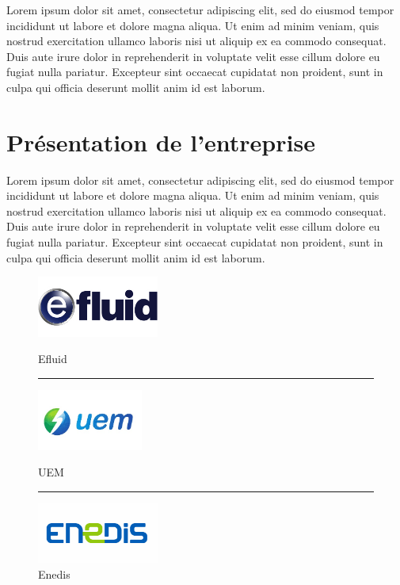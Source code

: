 \documentclass[a4paper, 12pt]{report}
\begin{document}
Lorem ipsum dolor sit amet, consectetur adipiscing elit, sed do eiusmod tempor incididunt ut labore et dolore magna aliqua. Ut enim ad minim veniam, quis nostrud exercitation ullamco laboris nisi ut aliquip ex ea commodo consequat. Duis aute irure dolor in reprehenderit in voluptate velit esse cillum dolore eu fugiat nulla pariatur. Excepteur sint occaecat cupidatat non proident, sunt in culpa qui officia deserunt mollit anim id est laborum.

\chapter{Présentation de l'entreprise}

Lorem ipsum dolor sit amet, consectetur adipiscing elit, sed do eiusmod tempor incididunt ut labore et dolore magna aliqua. Ut enim ad minim veniam, quis nostrud exercitation ullamco laboris nisi ut aliquip ex ea commodo consequat. Duis aute irure dolor in reprehenderit in voluptate velit esse cillum dolore eu fugiat nulla pariatur. Excepteur sint occaecat cupidatat non proident, sunt in culpa qui officia deserunt mollit anim id est laborum.

\begin{figure}
  \begin{center}
    \begin{minipage}{4cm}
      \begin{center}
        \includegraphics[height=2cm]{../res/logo-efluid.jpg}
        \caption{Efluid}
      \end{center}
    \end{minipage}
    \rule{1cm}{0cm}
    \begin{minipage}{4cm}
      \begin{center}
        \includegraphics[height=2cm]{../res/logo-uem.jpg}
        \caption{UEM}
      \end{center}
    \end{minipage}
    \rule{1cm}{0cm}
    \begin{minipage}{4cm}
      \begin{center}
        \includegraphics[height=2cm]{../res/logo-enedis.jpg}
        \caption{Enedis}
      \end{center}
    \end{minipage}
  \end{center}
\end{figure}
\end{document}
